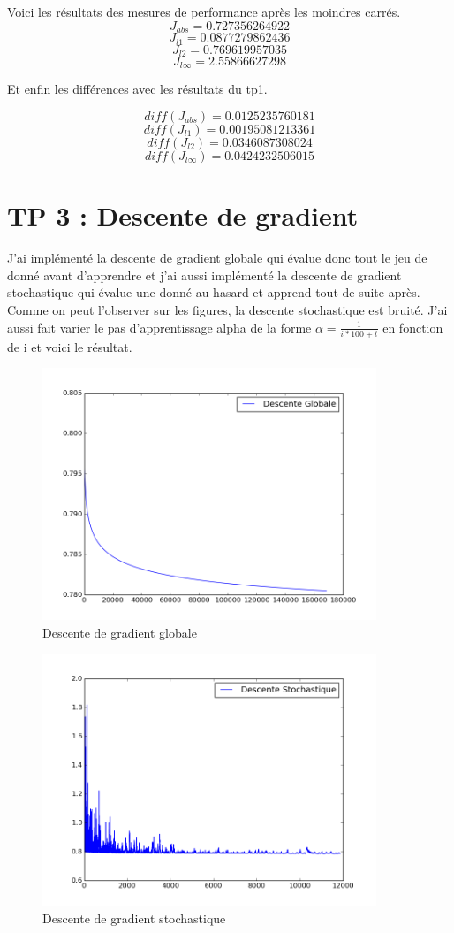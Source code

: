 \documentclass[a4paper,10pt]{report}
\begin{document}
Voici les résultats des mesures de performance après les moindres carrés.
$$J_{abs} = 0.727356264922$$
$$J_{l1} = 0.0877279862436 $$
$$J_{l2} = 0.769619957035$$
$$J_{l\infty} = 2.55866627298$$

Et enfin les différences avec les résultats du tp1.

$$diff(J_{abs}) =  0.0125235760181$$
$$diff(J_{l1}) = 0.00195081213361$$
$$diff(J_{l2}) =  0.0346087308024$$
$$diff(J_{l\infty}) = 0.0424232506015$$

\section{TP 3 : Descente de gradient }
J'ai implémenté la descente de gradient globale qui évalue donc tout le jeu de donné avant d'apprendre et 
j'ai aussi implémenté la descente de gradient stochastique qui évalue une donné au hasard et apprend tout de suite après.
Comme on peut l'observer sur les figures, la descente stochastique est bruité. 
J'ai aussi fait varier le pas d'apprentissage alpha de la forme $\alpha = \frac{1}{i*100+t}$ en fonction de i et voici le résultat.
\begin{figure}[!h]
 \centering
 \caption{Descente de gradient globale}
 \includegraphics[width=10cm]{globale.png}
\end{figure}

\begin{figure}[!h]
 \centering
 \caption{Descente de gradient stochastique}
 \includegraphics[width=10cm]{stochastique.png}
\end{figure}
\end{document}
